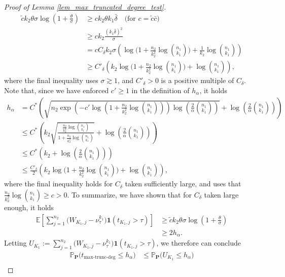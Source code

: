 \documentclass{article}
\newcommand{\bbP}{\mathbb{P}}
\newcommand{\bP}{\mathbf{P}}
\newcommand{\EE}{\mathbb{E}}
\newcommand{\one}{\mathbf{1}}
\newcommand{\chisqmax}{\text{max-trunc-deg}}
\begin{document}
\begin{proof}[Proof of Lemma \ref{lem_max_truncated_degree_test}]
\begin{align*}
    \tilde{c}k_2\theta \sigma \log\left(1 + \frac{\theta}{\sigma}\right) &\geq  ck_2\theta k_1 \bar{\delta} \quad \text{(for $c = \tilde{c}\bar{c}$)} \\
    &\geq c k_2 \frac{(k_1 \bar{\delta})^2}{\sigma} \\
    &= c C_\delta k_2 \sigma \left(\log\Big(1 + \frac{n_2}{k_2^2}\log {n_1 \choose k_1}\Big) + \frac{1}{k_2}\log {n_1 \choose k_1}\right) \\
    &\geq C'_\delta \left(k_2 \log\Big(1 + \frac{n_2}{k_2^2}\log {n_1 \choose k_1}\Big) + \log {n_1 \choose k_1}\right),
\end{align*}
where the final inequality uses $\sigma \gtrsim 1$, and $C'_\delta > 0$ is a positive multiple of $C_\delta$. Note that, since we have enforced $c' \geq 1$ in the definition of $h_\alpha$, it holds
\begin{align*}
h_\alpha &= C^*\left(\sqrt{n_2\exp\left(-c' \log(1 + \frac{n_2}{k_2^2}\log{n_1 \choose k_1})\right)\log\left(\frac{2}{\alpha}{n_1 \choose k_1}\right)} + \log\left(\frac{2}{\alpha}{n_1 \choose k_1}\right)\right) \\
&\leq C^*\left(k_2\sqrt{\frac{\frac{n_2}{k_2^2}\log {n_1 \choose k_1}}{1 + \frac{n_2}{k_2^2}\log {n_1 \choose k_1}}} + \log\left(\frac{2}{\alpha}{n_1 \choose k_1}\right)\right) \\
&\leq C^* \left(k_2 + \log\left(\frac{2}{\alpha}{n_1 \choose k_1}\right) \right) \\
&\leq \frac{C'_\delta}{2} \left(k_2 \log\Big(1 + \frac{n_2}{k_2^2}\log {n_1 \choose k_1}\Big) + \log {n_1 \choose k_1}\right),
\end{align*}
where the final inequality holds for $C_\delta$ taken sufficiently large, and uses that $\frac{n_2}{k_2^2}\log {n_1 \choose k_1} \geq c > 0$. To summarize, we have shown that for $C_\delta$ taken large enough, it holds
\begin{align*}
\EE\left[\sum_{j = 1}^{n_2}\big(W_{K_1,j} - \nu^{k_1}_{\tau}\big)\one(t_{K_1, j} > \tau)\right] &\geq \tilde{c}k_2\theta \sigma \log\left(1 + \frac{\theta}{\sigma}\right) \\
&\geq 2h_\alpha.
\end{align*}
Letting $U_{K_1} := \sum_{j = 1}^{n_2}\big(W_{K_1,j} - \nu^{k_1}_{\tau}\big)\one(t_{K_1, j} > \tau)$, we therefore can conclude
\begin{align*}
    \bbP_{\bP}\big(t_{\chisqmax} \leq h_\alpha\big) &\leq \bbP_{\bP}\big(U_{K_1} \leq h_\alpha\big)\\

\end{align*}
\end{proof}
\end{document}
